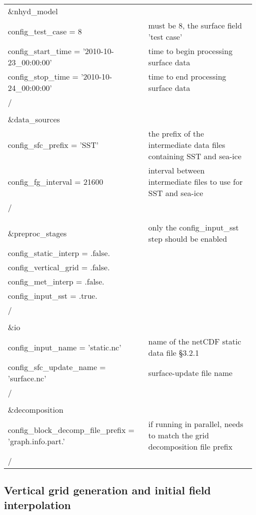 \begin{longtable}{p{3.0in} |p{3.25in}}
\&nhyd\_model\\
   config\_test\_case       = 8                      & must be 8, the surface field 'test case' \\
   config\_start\_time      = '2010-10-23\_00:00:00' & time to begin processing surface data \\
   config\_stop\_time       = '2010-10-24\_00:00:00' & time to end processing surface data \\
/\\
\\
\&data\_sources\\
   config\_sfc\_prefix      = 'SST'                  & the prefix of the intermediate data files containing SST and sea-ice \\
   config\_fg\_interval     = 21600                  & interval between intermediate files to use for SST and sea-ice \\
/\\
\\
\\
\&preproc\_stages                                    & only the config\_input\_sst step should be enabled \\
   config\_static\_interp   = .false.                & \\
   config\_vertical\_grid   = .false.                & \\
   config\_met\_interp      = .false.                & \\
   config\_input\_sst       = .true.                 & \\
/\\
\\
\&io\\
   config\_input\_name          = 'static.nc'        & name of the netCDF static data file \S 3.2.1 \\
   config\_sfc\_update\_name    = 'surface.nc'       & surface-update file name \\
/\\
\\
\&decomposition\\
   config\_block\_decomp\_file\_prefix = 'graph.info.part.' & if running in parallel, needs to match the grid decomposition file prefix \\
/\\

\end{longtable}



\subsection{Vertical grid generation and initial field interpolation}

